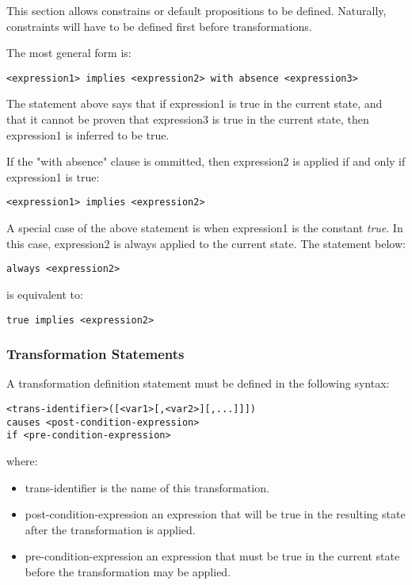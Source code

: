 \documentclass[a4paper]{article}
\begin{document}
        This section allows constrains or default propositions to be defined.
        Naturally, constraints will have to be defined first before
        transformations.

        The most general form is:

\begin{verbatim}
<expression1> implies <expression2> with absence <expression3>
\end{verbatim}

        The statement above says that if expression1 is true in the current
        state, and that it cannot be proven that expression3 is true in
        the current state, then expression1 is inferred to be true.

        If the "with absence" clause is ommitted, then expression2 is applied
        if and only if expression1 is true:

\begin{verbatim}
<expression1> implies <expression2>
\end{verbatim}

        A special case of the above statement is when expression1 is the
        constant \emph{true}. In this case, expression2 is always applied
        to the current state. The statement below:

\begin{verbatim}
always <expression2>
\end{verbatim}

        is equivalent to:

\begin{verbatim}
true implies <expression2>
\end{verbatim}

      \subsubsection{Transformation Statements}

        A transformation definition statement must be defined in the following
        syntax:

\begin{verbatim}
<trans-identifier>([<var1>[,<var2>][,...]]])
causes <post-condition-expression>
if <pre-condition-expression>
\end{verbatim}

        where:

        \begin{itemize}
          \item
            trans-identifier is the name of this transformation.
          \item
            post-condition-expression an expression that will be true in the
            resulting state after the transformation is applied.
          \item
            pre-condition-expression an expression that must be true in the
            current state before the transformation may be applied.
        \end{itemize}
\end{document}
